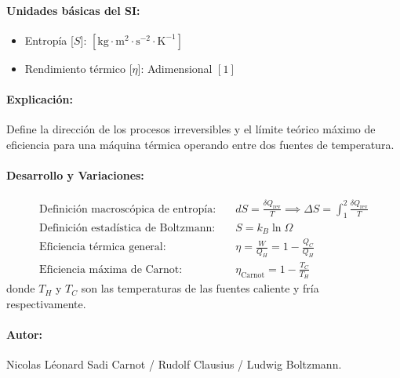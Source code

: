 \documentclass[12pt,a4paper]{article}
\begin{document}
\paragraph*{Unidades básicas del SI:}
\begin{itemize}
    \item Entropía [$S$]: $[\text{kg}\cdot\text{m}^2\cdot\text{s}^{-2}\cdot\text{K}^{-1}]$
    \item Rendimiento térmico [$\eta$]: Adimensional $[1]$
\end{itemize}
\paragraph*{Explicación:} Define la dirección de los procesos irreversibles y el límite teórico máximo de eficiencia para una máquina térmica operando entre dos fuentes de temperatura.
\paragraph*{Desarrollo y Variaciones:}
\begin{align*}
\text{Definición macroscópica de entropía:} \quad & dS = \frac{\delta Q_{\text{rev}}}{T} \implies \Delta S = \int_{1}^{2} \frac{\delta Q_{\text{rev}}}{T} \\
\text{Definición estadística de Boltzmann:} \quad & S = k_B \ln \Omega \\
\text{Eficiencia térmica general:} \quad & \eta = \frac{W}{Q_H} = 1 - \frac{Q_C}{Q_H} \\
\text{Eficiencia máxima de Carnot:} \quad & \eta_{\text{Carnot}} = 1 - \frac{T_C}{T_H}
\end{align*}
donde $T_H$ y $T_C$ son las temperaturas de las fuentes caliente y fría respectivamente.
\paragraph*{Autor:} Nicolas Léonard Sadi Carnot / Rudolf Clausius / Ludwig Boltzmann.
\end{document}
